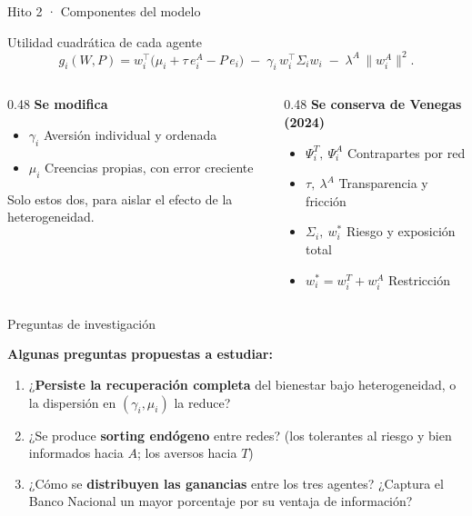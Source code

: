 \documentclass[xcolor=dvipsnames]{beamer}
\begin{document}
\begin{frame}{Hito 2 · Componentes del modelo}
\begin{block}{Utilidad cuadrática de cada agente}
  \[ g_i(W,P) = w_i^{\top}\!\big(\mu_i + \tau\, e_i^{A} - P\, e_i\big)
     \;-\; \gamma_i\, w_i^{\top}\Sigma_i w_i
     \;-\; \lambda^{A}\,\lVert w_i^{A}\rVert^{2}. \]
\end{block}
\vfill
\begin{columns}[T]
  \begin{column}{0.48\textwidth}
    \textbf{Se modifica}
    \begin{itemize}
      \item $\gamma_i$  Aversión individual y ordenada
      \item $\mu_i$  Creencias propias, con error creciente
    \end{itemize}
    {\footnotesize Solo estos dos, para aislar el efecto de la heterogeneidad.}
  \end{column}
  \begin{column}{0.48\textwidth}
    \textbf{Se conserva de Venegas (2024)}
    \begin{itemize}
      \item $\Psi_i^{T},\ \Psi_i^{A}$  Contrapartes por red
      \item $\tau,\ \lambda^{A}$  Transparencia y fricción
      \item $\Sigma_i,\ w_i^{*}$  Riesgo y exposición total
      \item $w_i^{*} = w_i^{T} + w_i^{A}$  Restricción
    \end{itemize}
  \end{column}
\end{columns}
\end{frame}


\begin{frame}{Preguntas de investigación}
\begin{center}
    \textbf{Algunas preguntas propuestas a estudiar:}
\end{center}
\begin{enumerate}
  \item ¿\textbf{Persiste la recuperación completa} del bienestar bajo
        heterogeneidad, o la dispersión en $(\gamma_i,\mu_i)$ la reduce?
  \item ¿Se produce \textbf{sorting endógeno} entre redes? (los tolerantes al
        riesgo y bien informados hacia $A$; los aversos hacia $T$)
  \item ¿Cómo se \textbf{distribuyen las ganancias} entre los tres agentes?
        ¿Captura el Banco Nacional un mayor porcentaje por su ventaja de
        información?
\end{enumerate}

\end{frame}
\end{document}
